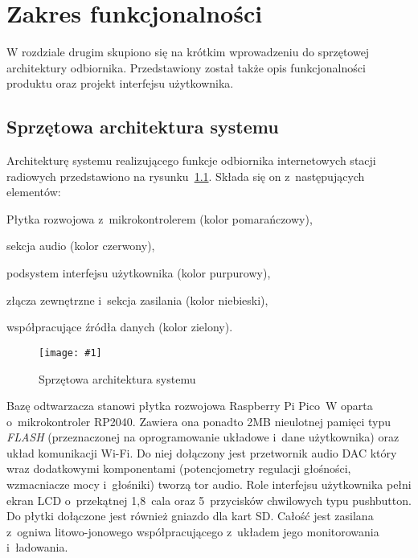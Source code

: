 \documentclass[polish]{aghengthesis}
\let\tempone\itemize
\let\temptwo\enditemize
\renewenvironment{itemize}{\tempone\setlength{\itemsep}{0cm}}{\temptwo}
\newcommand{\imgint}[4]{
	\begin{figure}[{#4}]
		\centering
		\texttt{[image: \#1]}
		\caption{#2}
		\label{#1}
	\end{figure}
}
\newcommand{\imgh}[3]{\imgint{#1}{#2}{#3}{H}}
\begin{document}
\cleardoublepage
\chapter{Zakres funkcjonalności}
	W rozdziale drugim skupiono się na krótkim wprowadzeniu do sprzętowej architektury odbiornika. Przedstawiony został także opis funkcjonalności produktu oraz projekt interfejsu użytkownika.\\
	
	\section{Sprzętowa architektura systemu}
			Architekturę systemu realizującego funkcje odbiornika internetowych stacji radiowych przedstawiono na rysunku~\ref{2/PicoRadio-hw-blocks}. Składa się on z~następujących elementów:
			\begin{itemize}
				\item Płytka rozwojowa z~mikrokontrolerem (kolor \textcolor{io-fg-orange}{pomarańczowy}),
				\item sekcja audio (kolor \textcolor{io-fg-red}{czerwony}),
				\item podsystem interfejsu użytkownika (kolor \textcolor{io-fg-purple}{purpurowy}),
				\item złącza zewnętrzne i~sekcja zasilania (kolor \textcolor{io-fg-blue}{niebieski}),
				\item współpracujące źródła danych (kolor \textcolor{io-fg-green}{zielony}).
			\end{itemize}
			
			\imgh{2/PicoRadio-hw-blocks}{Sprzętowa architektura systemu}{0.95}
			
			\pagebreak
			Bazę odtwarzacza stanowi płytka rozwojowa Raspberry Pi Pico~W oparta o~mikrokontroler RP2040. Zawiera ona ponadto 2MB nieulotnej pamięci typu \textit{FLASH} (przeznaczonej na oprogramowanie układowe i~dane użytkownika) oraz układ komunikacji Wi-Fi. Do niej dołączony jest przetwornik audio DAC który wraz dodatkowymi komponentami (potencjometry regulacji głośności, wzmacniacze mocy i~głośniki) tworzą tor audio. Role interfejsu użytkownika pełni ekran LCD o~przekątnej 1,8~cala oraz 5~przycisków chwilowych typu pushbutton. Do płytki dołączone jest również gniazdo dla kart SD. Całość jest zasilana z~ogniwa litowo-jonowego współpracującego z~układem jego monitorowania i~ładowania. 
			$ $\\
			
\end{document}
